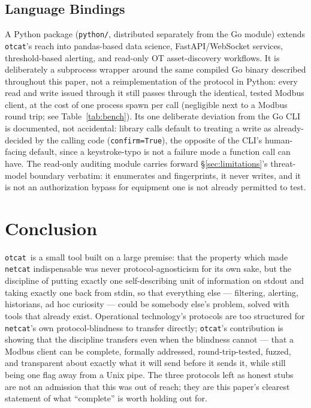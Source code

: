 \documentclass[10pt,conference]{IEEEtran}
\newcommand{\otcat}{\texttt{otcat}}
\newcommand{\code}[1]{\texttt{#1}}
\begin{document}
\subsection{Language Bindings}

A Python package (\code{python/}, distributed separately from the Go
module) extends \otcat's reach into pandas-based data science,
FastAPI/WebSocket services, threshold-based alerting, and read-only OT
asset-discovery workflows. It is deliberately a subprocess wrapper
around the same compiled Go binary described throughout this paper,
not a reimplementation of the protocol in Python: every read and write
issued through it still passes through the identical, tested Modbus
client, at the cost of one process spawn per call (negligible next to
a Modbus round trip; see Table~\ref{tab:bench}). Its one deliberate
deviation from the Go CLI is documented, not accidental: library calls
default to treating a write as already-decided by the calling code
(\code{confirm=True}), the opposite of the CLI's human-facing default,
since a keystroke-typo is not a failure mode a function call can have.
The read-only auditing module carries forward \S\ref{sec:limitations}'s
threat-model boundary verbatim: it enumerates and fingerprints, it
never writes, and it is not an authorization bypass for equipment one
is not already permitted to test.

\section{Conclusion}

\otcat\ is a small tool built on a large premise: that the property
which made \code{netcat} indispensable was never protocol-agnosticism
for its own sake, but the discipline of putting exactly one
self-describing unit of information on stdout and taking exactly one
back from stdin, so that everything else --- filtering, alerting,
historians, ad hoc curiosity --- could be somebody else's problem, solved
with tools that already exist. Operational technology's protocols are
too structured for \code{netcat}'s own protocol-blindness to transfer
directly; \otcat's contribution is showing that the discipline
transfers even when the blindness cannot --- that a Modbus client can be
complete, formally addressed, round-trip-tested, fuzzed, and
transparent about exactly what it will send before it sends it, while
still being one flag away from a Unix pipe. The three protocols left
as honest stubs are not an admission that this was out of reach; they
are this paper's clearest statement of what ``complete'' is worth
holding out for.
\end{document}
